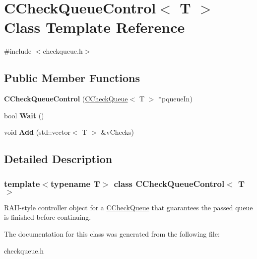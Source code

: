 \hypertarget{class_c_check_queue_control}{}\section{C\+Check\+Queue\+Control$<$ T $>$ Class Template Reference}
\label{class_c_check_queue_control}


{\ttfamily \#include $<$checkqueue.\+h$>$}

\subsection*{Public Member Functions}
\begin{DoxyCompactItemize}
\item 
\mbox{\label{class_c_check_queue_control_ae690afca20574a7c98e0c5e82011c606}} 
{\bfseries C\+Check\+Queue\+Control} (\mbox{\hyperlink{class_c_check_queue}{C\+Check\+Queue}}$<$ T $>$ $\ast$pqueue\+In)
\item 
\mbox{\label{class_c_check_queue_control_ab31d809a76b876d21608c0c5d0e3baf0}} 
bool {\bfseries Wait} ()
\item 
\mbox{\label{class_c_check_queue_control_aa11e8248c91b0758b39132db4090ff8d}} 
void {\bfseries Add} (std\+::vector$<$ T $>$ \&v\+Checks)
\end{DoxyCompactItemize}


\subsection{Detailed Description}
\subsubsection*{template$<$typename T$>$\newline
class C\+Check\+Queue\+Control$<$ T $>$}

R\+A\+I\+I-\/style controller object for a \mbox{\hyperlink{class_c_check_queue}{C\+Check\+Queue}} that guarantees the passed queue is finished before continuing. 

The documentation for this class was generated from the following file\+:\begin{DoxyCompactItemize}
\item 
checkqueue.\+h\end{DoxyCompactItemize}
